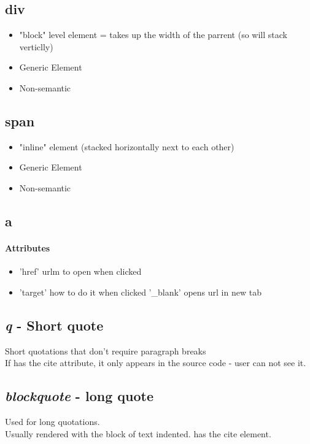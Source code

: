 \documentclass[]{article}
\newcommand{\<}{\guilsinglleft}
\renewcommand{\>}{\guilsinglright}
\renewcommand{\it}[1]{\textit{#1}}
\begin{document}
\subsection{div}
\begin{itemize}
	\item "block" level element = takes up the width of the parrent (so will stack verticlly)
	\item Generic Element
	\item Non-semantic
\end{itemize}

\subsection{span}
\begin{itemize}
	\item "inline" element (stacked horizontally next to each other)
	\item Generic Element
	\item Non-semantic
\end{itemize}

\subsection{a}
\paragraph{Attributes}
\begin{itemize}
	\item 'href' urlm to open when clicked
	\item 'target' how to do it when clicked
	\subitem '\_blank' opens url in new tab 
\end{itemize}

\subsection{\it{q} - Short quote}
Short quotations that don't require paragraph breaks
\\
If has the cite attribute, it only appears in the source code - user can not see it.


\subsection{\it{blockquote} - long quote}
Used for long quotations.
\\
Usually rendered with the block of text indented.
has the cite element.
\end{document}
